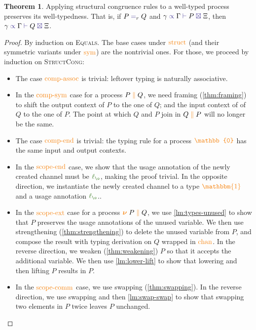 \documentclass[a4paper,UKenglish,cleveref,autoref,thm-restate,authorcolumns]{lipics-v2019}
\theoremstyle{definition}
\newtheorem{nitheorem}[theorem]{Theorem}
\newcommand{\type}[1]{\textcolor{BlueViolet}{\operatorname{#1}}}
\newcommand{\constr}[1]{\textcolor{BurntOrange}{\operatorname{#1}}}
\newcommand{\func}[1]{\textcolor{OliveGreen}{\operatorname{#1}}}
\newcommand{\PO}{\constr{\mathbb{0}}}
\newcommand{\comp}[2]{#1 \; \constr{\parallel} \; #2}
\newcommand{\new}{\constr{\boldsymbol{\nu}} \;}
\newcommand{\unit}{\constr{\mathbbm{1}}}
\newcommand{\lz}{\func{\ell_{\o}}}
\newcommand{\types}[4]{#1 \; \type{\propto} \; #2 \; \type{\vdash} \; #3 \; \type{\boxtimes} \; #4}
\newcommand{\eq}[1]{\; \type{=}_{#1} \;}
\begin{document}
\begin{nitheorem}
  \label{thm:subject-congruence}
  Applying structural congruence rules to a well-typed process preserves its well-typedness.
  That is, if $P \eq{r} Q$ and $\types{\gamma}{\Gamma}{P}{\Xi}$, then $\types{\gamma}{\Gamma}{Q}{\Xi}$.
\end{nitheorem}

\begin{proof}
  By induction on \textsc{Equals}.
  The base cases under $\constr{struct}$ (and their symmetric variants under $\constr{sym}$) are the nontrivial ones.
  For those, we proceed by induction on \textsc{StructCong}:
  \begin{itemize}
    \item
      The case $\constr{comp-assoc}$ is trivial: leftover typing is naturally associative.
    \item
      In the $\constr{comp-sym}$ case for a process $\comp{P}{Q}$, we need framing (\autoref{thm:framing}) to shift the output context of $P$ to the one of $Q$; and the input context of of $Q$ to the one of $P$.
      The point at which $Q$ and $P$ join in $\comp{Q}{P}$ will no longer be the same.
    \item
      The case $\constr{comp-end}$ is trivial: the typing rule for a process $\PO$ has the same input and output contexts.
    \item
      In the $\constr{scope-end}$ case, we show that the usage annotation of the newly created channel must be $\lz$, making the proof trivial.
      In the opposite direction, we instantiate the newly created channel to a type $\unit$ and a usage annotation $\lz$..
    \item
      In the $\constr{scope-ext}$ case for a process $\new \comp{P}{Q}$, we use \autoref{lm:types-unused} to show that $P$ preserves the usage annotations of the unused variable.
      We then use strengthening (\autoref{thm:strengthening}) to delete the unused variable from $P$, and compose the result with typing derivation on $Q$ wrapped in $\constr{chan}$.
      In the reverse direction, we weaken (\autoref{thm:weakening}) $P$ so that it accepts the additional variable.
      We then use \autoref{lm:lower-lift} to show that lowering and then lifting $P$ results in $P$.
    \item
      In the $\constr{scope-comm}$ case, we use swapping (\autoref{thm:swapping}).
      In the reverse direction, we use swapping and then \autoref{lm:swap-swap} to show that swapping two elements in $P$ twice leaves $P$ unchanged.
  \end{itemize}
\end{proof}
\end{document}
